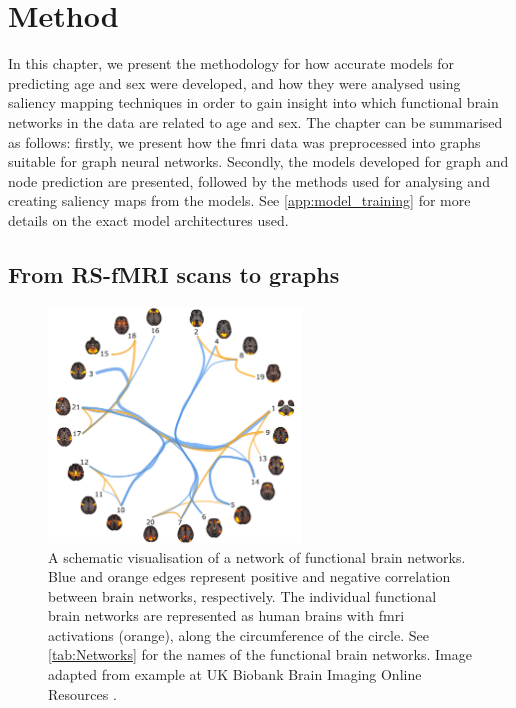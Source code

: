 \chapter{Method}
\label{chap:method}

In this chapter, we present the methodology for how accurate models for predicting age and sex were developed, and how they were analysed using saliency mapping techniques in order to gain insight into which functional brain networks in the data are related to age and sex. The chapter can be summarised as follows: firstly, we present how the \acrshort{fmri} data was preprocessed into graphs suitable for graph neural networks. Secondly, the models developed for graph and node prediction are presented, followed by the methods used for analysing and creating saliency maps from the models. See \cref{app:model_training} for more details on the exact model architectures used. 

\section{From RS-fMRI scans to graphs}\label{sec:fmri_to_graphs}

\begin{figure}[!htbp]
    \centering
    \includegraphics[width=0.6\textwidth]{chapters/images_methods/fmri_network_ukbiobank.png}
    \caption{A schematic visualisation of a network of functional brain networks. Blue and orange edges represent positive and negative correlation between brain networks, respectively.  The individual functional brain networks are represented as human brains with \acrshort{fmri} activations (orange), along the circumference of the circle. See \cref{tab:Networks} for the names of the functional brain networks. Image adapted from example at UK Biobank Brain Imaging Online Resources \cite{ukbiobank_brain_imaging}.}
    \label{fig:fmri_network}
\end{figure}

